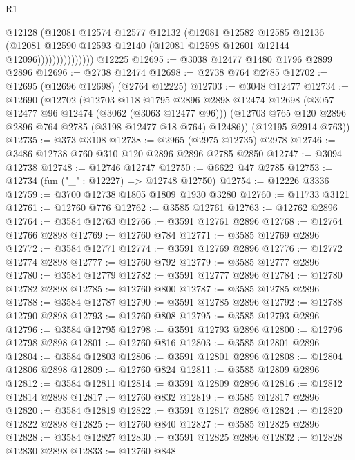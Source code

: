 \begin{lexlean}{R1}
\begin{coremodule}
                          @12128
                          (@12081
                            @12574
                            @12577
                            @12132
                            (@12081
                              @12582
                              @12585
                              @12136
                              (@12081
                                @12590
                                @12593
                                @12140
                                (@12081 @12598 @12601 @12144 @12096)))))))))))))))
    @12225
@12695 := @3038 @12477 @1480 @1796 @2899 @2896
@12696 := @2738 @12474
@12698 := @2738 @764 @2785
@12702 := @12695 (@12696 @12698) (@2764 @12225)
@12703 := @3048 @12477
@12734 := @12690
    (@12702
      (@12703
        @118
        @1795
        @2896
        @2898
        @12474
        @12698
        (@3057 @12477 @96 @12474 (@3062 (@3063 @12477 @96)))
        (@12703 @765 @120 @2896 @2896 @764 @2785 (@3198 @12477 @18 @764) @12486))
      (@12195 @2914 @763))
@12735 := @373 @3108
@12738 := @2965 (@2975 @12735) @2978
@12746 := @3486 @12738 @760 @310 @120 @2896 @2896 @2785 @2850
@12747 := @3094 @12738
@12748 := @12746 @12747
@12750 := @6622 @47 @2785
@12753 := @12734 (fun ("_" : @12227) => @12748 @12750)
@12754 := @12226 @3336
@12759 := @3700 @12738 @1805 @1809 @1930 @3280
@12760 := @11733 @3121
@12761 := @12760 @776
@12762 := @3585 @12761
@12763 := @12762 @2896
@12764 := @3584 @12763
@12766 := @3591 @12761 @2896
@12768 := @12764 @12766 @2898
@12769 := @12760 @784
@12771 := @3585 @12769 @2896
@12772 := @3584 @12771
@12774 := @3591 @12769 @2896
@12776 := @12772 @12774 @2898
@12777 := @12760 @792
@12779 := @3585 @12777 @2896
@12780 := @3584 @12779
@12782 := @3591 @12777 @2896
@12784 := @12780 @12782 @2898
@12785 := @12760 @800
@12787 := @3585 @12785 @2896
@12788 := @3584 @12787
@12790 := @3591 @12785 @2896
@12792 := @12788 @12790 @2898
@12793 := @12760 @808
@12795 := @3585 @12793 @2896
@12796 := @3584 @12795
@12798 := @3591 @12793 @2896
@12800 := @12796 @12798 @2898
@12801 := @12760 @816
@12803 := @3585 @12801 @2896
@12804 := @3584 @12803
@12806 := @3591 @12801 @2896
@12808 := @12804 @12806 @2898
@12809 := @12760 @824
@12811 := @3585 @12809 @2896
@12812 := @3584 @12811
@12814 := @3591 @12809 @2896
@12816 := @12812 @12814 @2898
@12817 := @12760 @832
@12819 := @3585 @12817 @2896
@12820 := @3584 @12819
@12822 := @3591 @12817 @2896
@12824 := @12820 @12822 @2898
@12825 := @12760 @840
@12827 := @3585 @12825 @2896
@12828 := @3584 @12827
@12830 := @3591 @12825 @2896
@12832 := @12828 @12830 @2898
@12833 := @12760 @848

\end{coremodule}
\end{lexlean}
